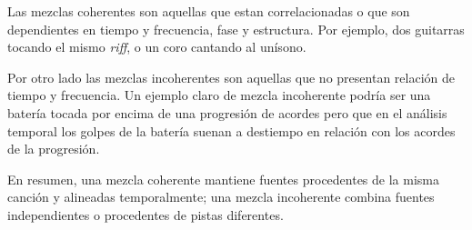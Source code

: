 Las mezclas coherentes son aquellas que estan correlacionadas o que son dependientes en tiempo y frecuencia, fase y estructura. Por ejemplo, dos guitarras tocando el mismo \textit{riff}, o un coro cantando al unísono.

Por otro lado las mezclas incoherentes son aquellas que no presentan relación de tiempo y frecuencia. Un ejemplo claro de mezcla incoherente podría ser una batería tocada por encima de una progresión de acordes pero que en el análisis temporal los golpes de la batería suenan a destiempo en relación con los acordes de la progresión.

En resumen, una mezcla coherente mantiene fuentes procedentes de la misma canción y alineadas temporalmente; una mezcla incoherente combina fuentes independientes o procedentes de pistas diferentes.